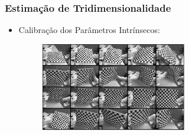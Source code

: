 \documentclass[brazil]{beamer}
\begin{document}
\begin{frame}
\frametitle{Estimação de Tridimensionalidade}
  \begin{itemize}
      \item Calibração dos Parâmetros Intrínsecos:
      \begin{figure}
        \centering
        \includegraphics[width = 0.6\textwidth, keepaspectratio]{./img/TG_calib_images.png}
      \end{figure}
  \end{itemize} 
\end{frame}
\end{document}
